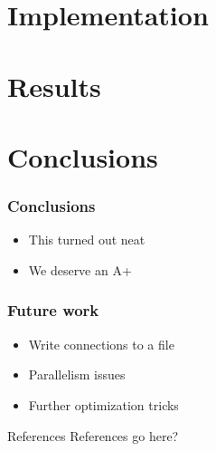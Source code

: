 \documentclass{beamer}
\begin{document}
\section{Implementation}
\section{Results}
\section{Conclusions}

\begin{frame}
  \frametitle{Conclusions}
  \begin{itemize}
	 \item This turned out neat
	 \item We deserve an A+
  \end{itemize}
\end{frame}

\begin{frame}
  \frametitle{Future work}
  \begin{itemize}
	 \item Write connections to a file
	 \item Parallelism issues
   \item Further optimization tricks
  \end{itemize}
\end{frame}

\appendix
\begin{frame}{References}
  References go here?
\end{frame}
\end{document}
